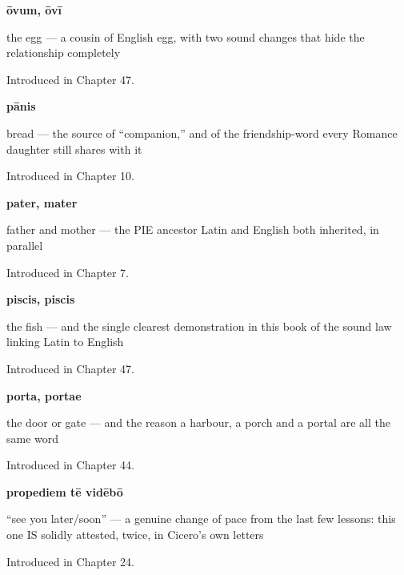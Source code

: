 \noindent\begin{minipage}[t]{\linewidth}
\raggedright
\textbf{ōvum, ōvī}\par
\small the egg — a cousin of English egg, with two sound changes that hide the relationship completely\par
\footnotesize Introduced in Chapter 47.
\end{minipage}\par\medskip

\noindent\begin{minipage}[t]{\linewidth}
\raggedright
\textbf{pānis}\par
\small bread — the source of \textquotedblleft{}companion,\textquotedblright{} and of the friendship-word every Romance daughter still shares with it\par
\footnotesize Introduced in Chapter 10.
\end{minipage}\par\medskip

\noindent\begin{minipage}[t]{\linewidth}
\raggedright
\textbf{pater, mater}\par
\small father and mother — the PIE ancestor Latin and English both inherited, in parallel\par
\footnotesize Introduced in Chapter 7.
\end{minipage}\par\medskip

\noindent\begin{minipage}[t]{\linewidth}
\raggedright
\textbf{piscis, piscis}\par
\small the fish — and the single clearest demonstration in this book of the sound law linking Latin to English\par
\footnotesize Introduced in Chapter 47.
\end{minipage}\par\medskip

\noindent\begin{minipage}[t]{\linewidth}
\raggedright
\textbf{porta, portae}\par
\small the door or gate — and the reason a harbour, a porch and a portal are all the same word\par
\footnotesize Introduced in Chapter 44.
\end{minipage}\par\medskip

\noindent\begin{minipage}[t]{\linewidth}
\raggedright
\textbf{propediem tē vidēbō}\par
\small \textquotedblleft{}see you later/soon\textquotedblright{} — a genuine change of pace from the last few lessons: this one IS solidly attested, twice, in Cicero's own letters\par
\footnotesize Introduced in Chapter 24.
\end{minipage}\par\medskip

